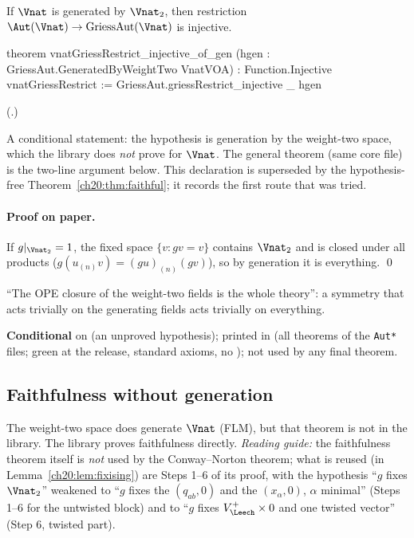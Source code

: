 \begin{theorem}\label{ch20:thm:faithgen}
If $\Vnat$ is generated by $\Vnat_2$, then restriction $\Aut(\Vnat)\to\mathrm{GriessAut}(\Vnat)$ is injective.
\end{theorem}
\begin{leancode}
theorem vnatGriessRestrict_injective_of_gen (hgen : GriessAut.GeneratedByWeightTwo VnatVOA) :
    Function.Injective vnatGriessRestrict :=
  GriessAut.griessRestrict_injective _ hgen
\end{leancode}
(.)
\begin{dictionary}
A conditional statement: the hypothesis  is generation by the weight-two space, which the library does
\emph{not} prove for $\Vnat$.  The general theorem  (same core file) is the
two-line argument below.  This declaration is superseded by the hypothesis-free
Theorem~\ref{ch20:thm:faithful}; it records the first route that was tried.
\end{dictionary}
\paragraph{Proof on paper.}  If $g|_{\Vnat_2}=1$, the fixed space $\{v:gv=v\}$ contains $\Vnat_2$ and is closed under
all products ($g(u_{(n)}v)=(gu)_{(n)}(gv)$), so by generation it is everything. \qed
\begin{physics}
``The OPE closure of the weight-two fields is the whole theory'': a symmetry that acts trivially on the generating
fields acts trivially on everything.
\end{physics}
\begin{status}
\textbf{Conditional} on  (an unproved hypothesis); printed in  (all theorems of the \texttt{Aut*} files; green at the release, standard axioms, no ); not used by any final theorem.
\end{status}

\subsection{Faithfulness without generation}

The weight-two space does generate $\Vnat$ (FLM), but that theorem is not in the library.  The library proves
faithfulness directly.  \emph{Reading guide:} the faithfulness theorem itself is \emph{not} used by the Conway--Norton theorem;
what is reused (in Lemma~\ref{ch20:lem:fixising}) are Steps 1--6 of its proof, with the hypothesis ``$g$ fixes $\Vnat_2$''
weakened to ``$g$ fixes the $(q_{ab},0)$ and the $(x_\alpha,0)$, $\alpha$ minimal'' (Steps 1--6 for the untwisted block) and to
``$g$ fixes $\chtwentyVL\times0$ and one twisted vector'' (Step 6, twisted part).

